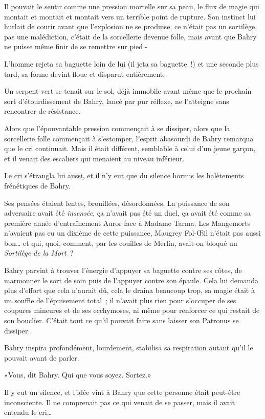 Il pouvait le sentir comme une pression mortelle sur sa peau, le flux de magie qui montait et montait et montait vers un terrible point de rupture. Son instinct lui hurlait de courir avant que l'explosion ne se produise, ce n'était pas un sortilège, pas une malédiction, c'était de la sorcellerie devenue folle, mais avant que Bahry ne puisse même finir de se remettre sur pied -

L'homme rejeta sa baguette loin de lui (il jeta sa baguette~!) et une seconde plus tard, sa forme devint floue et disparut entièrement.

Un serpent vert se tenait sur le sol, déjà immobile avant même que le prochain sort d'étourdissement de Bahry, lancé par pur réflexe, ne l'atteigne sans rencontrer de résistance.

Alors que l'épouvantable pression commençait à se dissiper, alors que la sorcellerie folle commençait à s'estomper, l'esprit abasourdi de Bahry remarqua que le cri continuait. Mais il était différent, semblable à celui d'un jeune garçon, et il venait des escaliers qui menaient au niveau inférieur.

Le cri s'étrangla lui aussi, et il n'y eut que du silence hormis les halètements frénétiques de Bahry.

Ses pensées étaient lentes, brouillées, désordonnées. La puissance de son adversaire avait été \emph{insensée}, ça n'avait pas été un duel, ça avait été comme sa première année d'entraînement Auror face à Madame Tarma. Les Mangemorts n'avaient pas eu un dixième de cette puissance, Maugrey Fol-Œil n'était pas aussi bon… et qui, quoi, comment, par les couilles de Merlin, avait-on bloqué un \emph{Sortilège de la Mort}~?

Bahry parvint à trouver l'énergie d'appuyer sa baguette contre ses côtes, de marmonner le sort de soin puis de l'appuyer contre son épaule. Cela lui demanda plus d'effort que cela n'aurait dû, cela le draina beaucoup trop, sa magie était à un souffle de l'épuisement total~; il n'avait plus rien pour s'occuper de ses coupures mineures et de ses ecchymoses, ni même pour renforcer ce qui restait de son bouclier. C'était tout ce qu'il pouvait faire sans laisser son Patronus se dissiper.

Bahry inspira profondément, lourdement, stabilisa sa respiration autant qu'il le pouvait avant de parler.

«Vous, dit Bahry. Qui que vous soyez. Sortez.»

Il y eut un silence, et l'idée vint à Bahry que cette personne était peut-être inconsciente. Il ne comprenait pas ce qui venait de se passer, mais il avait entendu le cri…

